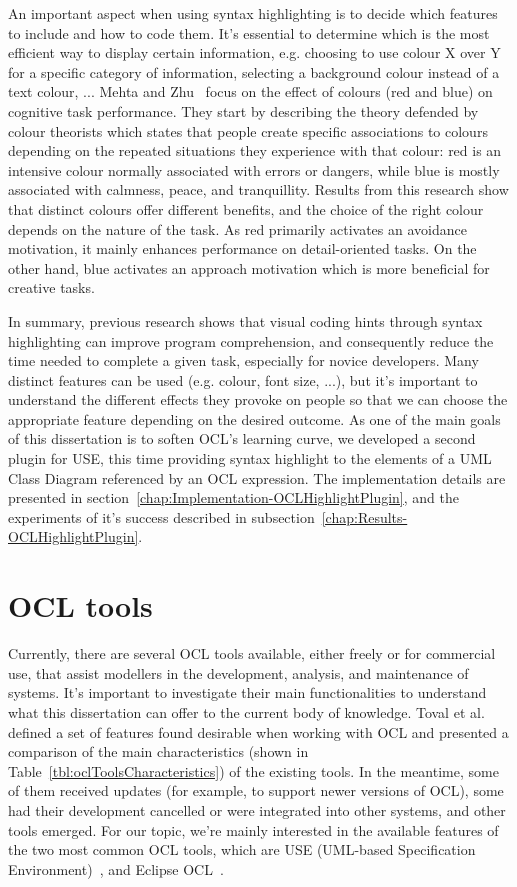 An important aspect when using syntax highlighting is to decide which features to include and how to code them. It's essential to determine which is the most efficient way to display certain information, e.g. choosing to use colour X over Y for a specific category of information, selecting a background colour instead of a text colour, ... Mehta and Zhu~\cite{Mehta2009} focus on the effect of colours (red and blue) on cognitive task performance. They start by describing the theory defended by colour theorists which states that people create specific associations to colours depending on the repeated situations they experience with that colour: red is an intensive colour normally associated with errors or dangers, while blue is mostly associated with calmness, peace, and tranquillity. Results from this research show that distinct colours offer different benefits, and the choice of the right colour depends on the nature of the task. As red primarily activates an avoidance motivation, it mainly enhances performance on detail-oriented tasks. On the other hand, blue activates an approach motivation which is more beneficial for creative tasks.

In summary, previous research shows that visual coding hints through syntax highlighting can improve program comprehension, and consequently reduce the time needed to complete a given task, especially for novice developers. Many distinct features can be used (e.g. colour, font size, ...), but it's important to understand the different effects they provoke on people so that we can choose the appropriate feature depending on the desired outcome. As one of the main goals of this dissertation is to soften OCL's learning curve, we developed a second plugin for USE, this time providing syntax highlight to the elements of a UML Class Diagram referenced by an OCL expression. The implementation details are presented in section~\ref{chap:Implementation-OCLHighlightPlugin}, and the experiments of it's success described in subsection~\ref{chap:Results-OCLHighlightPlugin}.

\section{OCL tools}
\label{sec:RelatedWork-OCLTools}

Currently, there are several OCL tools available, either freely or for commercial use, that assist modellers in the development, analysis, and maintenance of systems. It's important to investigate their main functionalities to understand what this dissertation can offer to the current body of knowledge. Toval et al. ~\cite{Toval2003} defined a set of features found desirable when working with OCL and presented a comparison of the main characteristics (shown in Table~\ref{tbl:oclToolsCharacteristics}) of the existing tools. In the meantime, some of them received updates (for example, to support newer versions of OCL), some had their development cancelled or were integrated into other systems, and other tools emerged. For our topic, we're mainly interested in the available features of the two most common OCL tools, which are USE (UML-based Specification Environment)~\cite{use}, and Eclipse OCL~\cite{eclipseocl}.

